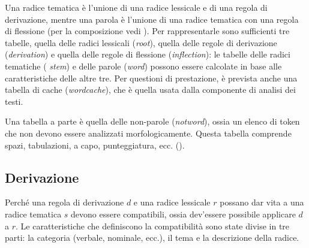 \documentclass[twoside,stylearticle,11pt,filologia,it,article,bibsection]{spinoza}
\begin{document}
Una radice tematica è l'unione di una radice lessicale e di una regola
di derivazione, mentre una parola è l'unione di una radice tematica
con una regola di flessione (per la composizione vedi
). Per rappresentarle sono sufficienti tre
tabelle, quella delle radici lessicali ({\it root}), quella delle
regole di derivazione ({\it derivation}) e quella delle regole di
flessione ({\it inflection}): le tabelle delle radici tematiche ({\it
  stem}) e delle parole ({\it word}) possono essere calcolate in base
alle caratteristiche delle altre tre. Per questioni di prestazione, è
prevista anche una tabella di cache ({\it wordcache}), che è quella
usata dalla componente di analisi dei testi.


Una tabella a parte è quella delle non-parole ({\it notword}), ossia
un elenco di token che non devono essere analizzati
morfologicamente. Questa tabella comprende spazi, tabulazioni, a capo,
punteggiatura, ecc. (\vedi {}).


\subsection{Derivazione}

\label{sec:derivazione}


Perché una regola di derivazione $d$ e una radice lessicale $r$
possano dar vita a una radice tematica $s$ devono essere compatibili,
ossia dev'essere possibile applicare $d$ a $r$. Le caratteristiche che
definiscono la compatibilità sono state divise in tre parti: la
categoria (verbale, nominale, ecc.), il tema e la descrizione della
radice.
\end{document}
